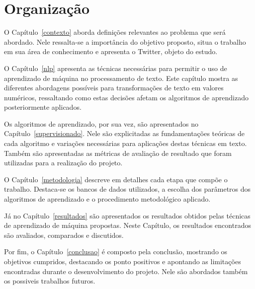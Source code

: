 \section{Organização}

O Capítulo~\ref{contexto} aborda definições relevantes ao problema que será abordado.
Nele ressalta-se a importância do objetivo proposto, situa o trabalho em sua área de conhecimento e apresenta o Twitter,
objeto do estudo.

O Capítulo~\ref{nlp} apresenta as técnicas necessárias para permitir o uso de aprendizado de máquina no processamento de
texto.
Este capítulo mostra as diferentes abordagens possíveis para transformações de texto em valores numéricos, ressaltando
como estas decisões afetam os algoritmos de aprendizado posteriormente aplicados.

Os algoritmos de aprendizado, por sua vez, são apresentados no Capítulo~\ref{supervisionado}.
Nele são explicitadas as fundamentações teóricas de cada algoritmo e variações necessárias para aplicações destas
técnicas em texto.
Também são apresentadas as métricas de avaliação de resultado que foram utilizadas para a realização do projeto.

O Capítulo~\ref{metodologia} descreve em detalhes cada etapa que compõe o trabalho.
Destaca-se os bancos de dados utilizados, a escolha dos parâmetros dos algoritmos de aprendizado e o procedimento
metodológico aplicado.

Já no Capítulo~\ref{resultados} são apresentados os resultados obtidos pelas técnicas de aprendizado de máquina propostas.
Neste Capítulo, os resultados encontrados são avaliados, comparados e discutidos.

Por fim, o Capítulo~\ref{conclusao} é composto pela conclusão, mostrando os objetivos cumpridos, destacando os ponto
positivos e apontando as limitações encontradas durante o desenvolvimento do projeto.
Nele são abordados também os possiveis trabalhos futuros.
